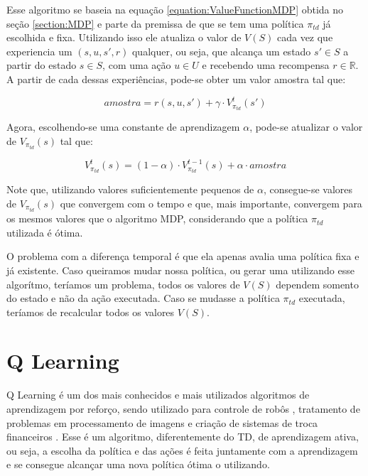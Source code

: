 Esse algoritmo se baseia na equação \ref{equation:ValueFunctionMDP} obtida no seção \ref{section:MDP} e parte da premissa de que se tem uma política $ \pi_{td} $ já escolhida e fixa. Utilizando isso ele atualiza o valor de $ V \left( S \right) $ cada vez que experiencia um $ \left( s, u, s', r \right) $ qualquer, ou seja, que alcança um estado $ s' \in S $ a partir do estado $ s \in S $, com uma ação $ u \in U $ e recebendo uma recompensa $ r \in \mathbb{R} $. A partir de cada dessas experiências, pode-se obter um valor amostra tal que:

\begin{equation} \label{equation:AmostraTD}
	amostra = r \left( s, u, s' \right) + \gamma \cdot V_{\pi_{td}}^t \left( s' \right)
\end{equation}

Agora, escolhendo-se uma constante de aprendizagem $ \alpha $, pode-se atualizar o valor de $ V_{\pi_{td}} \left( s \right) $ tal que:

\begin{equation} \label{equation:UpdateValueFunctionTD}
	V_{\pi_{td}}^t \left( s \right) = \left( 1 - \alpha \right) \cdot V_{\pi_{td}}^{t-1} \left( s \right) + \alpha \cdot amostra
\end{equation}

Note que, utilizando valores suficientemente pequenos de $ \alpha $, consegue-se valores de $ V_{\pi_{td}} \left( s \right) $ que convergem com o tempo e que, mais importante, convergem para os mesmos valores que o algoritmo MDP, considerando que a política $ \pi_{td} $ utilizada é ótima.

O problema com a diferença temporal é que ela apenas avalia uma política fixa e já existente. Caso queiramos mudar nossa política, ou gerar uma utilizando esse algorítmo, teríamos um problema, todos os valores de $ V \left( S \right) $ dependem somento do estado e não da ação executada. Caso se mudasse a política $ \pi_{td} $ executada, teríamos de recalcular todos os valores $ V \left( S \right) $.

\section{Q Learning} \label{section:QLearning}

Q Learning é um dos mais conhecidos e mais utilizados algoritmos de aprendizagem por reforço, sendo utilizado para controle de robôs \cite{Gaskett:2002}, tratamento de problemas em processamento de imagens \cite{Alexandru-Learning} e criação de sistemas de troca financeiros \cite{RePEc:ven:wpaper:2014:15}. Esse é um algoritmo, diferentemente do TD, de aprendizagem ativa, ou seja, a escolha da política e das ações é feita juntamente com a aprendizagem e se consegue alcançar uma nova política ótima o utilizando.

